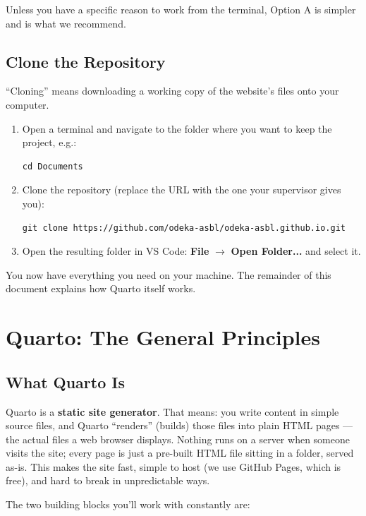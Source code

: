 \documentclass[11pt]{article}
\newcommand{\term}[1]{\textbf{#1}}
\begin{document}
Unless you have a specific reason to work from the terminal, Option A is
simpler and is what we recommend.

\subsection{Clone the Repository}

``Cloning'' means downloading a working copy of the website's files onto
your computer.

\begin{enumerate}
    \item Open a terminal and navigate to the folder where you want to keep
    the project, e.g.:
\begin{lstlisting}
cd Documents
\end{lstlisting}
    \item Clone the repository (replace the URL with the one your
    supervisor gives you):
\begin{lstlisting}
git clone https://github.com/odeka-asbl/odeka-asbl.github.io.git
\end{lstlisting}
    \item Open the resulting folder in VS Code: \textbf{File} $\to$
    \textbf{Open Folder...} and select it.
\end{enumerate}

You now have everything you need on your machine. The remainder of this
document explains how Quarto itself works.

\section{Quarto: The General Principles}
\label{sec:quarto-basics}

\subsection{What Quarto Is}

Quarto is a \term{static site generator}. That means: you write content in
simple source files, and Quarto ``renders'' (builds) those files into
plain HTML pages --- the actual files a web browser displays. Nothing runs
on a server when someone visits the site; every page is just a
pre-built HTML file sitting in a folder, served as-is. This makes the site
fast, simple to host (we use GitHub Pages, which is free), and hard to
break in unpredictable ways.

The two building blocks you'll work with constantly are:
\end{document}
